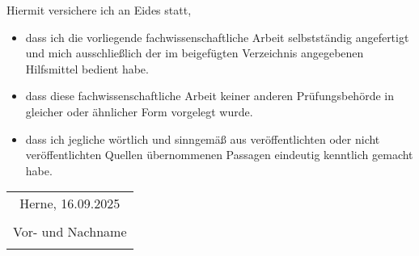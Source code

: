 
\thispagestyle{empty} %
Hiermit versichere ich an Eides statt,
\begin{itemize}
  \item dass ich die vorliegende fachwissenschaftliche Arbeit
    selbstständig angefertigt und mich ausschließlich der im
    beigefügten Verzeichnis angegebenen Hilfsmittel bedient habe.
  \item dass diese fachwissenschaftliche Arbeit keiner anderen
    Prüfungsbehörde in gleicher oder ähnlicher Form vorgelegt wurde.
  \item dass ich jegliche wörtlich und sinngemäß aus veröffentlichten
    oder nicht veröffentlichten Quellen übernommenen Passagen
    eindeutig kenntlich gemacht habe.
\end{itemize}
\bigskip
\bigskip
\bigskip
\bigskip
\bigskip

\begin{flushright}
  \begin{tabular}{c}
    Herne, 16.09.2025
    \vspace*{1cm} \\
    \dotfill \\
    Vor- und Nachname \\
    \hspace{5cm} \\
  \end{tabular}
\end{flushright}
\thispagestyle{empty} %



